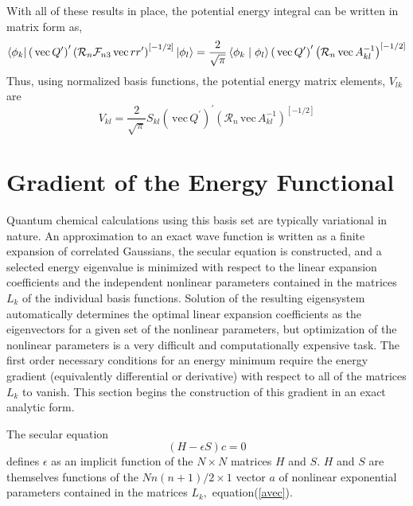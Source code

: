 \documentclass[12pt,thmsa,suthesis,verbatim]{report}
\begin{document}
With all of these results in place, the potential energy integral can be
written in matrix form as, 
\begin{equation}
\left\langle \phi _k\right| \left( \,\mathrm{vec}\,Q^{\prime }\right)
^{\prime }\left( \mathcal{R}_n\mathcal{F}_{n3}\,\mathrm{vec}\,rr^{\prime
}\right) ^{\left[ -1/2\right] }\left| \phi _l\right\rangle =\frac 2{\sqrt{%
\pi }}\left\langle \phi _k\right. |\left. \phi _l\right\rangle \left( \,%
\mathrm{vec}\,Q^{\prime }\right) ^{\prime }\left( \mathcal{R}_n\,\mathrm{vec}%
\,A_{kl}^{-1}\right) ^{\left[ -1/2\right] }
\end{equation}
Thus, using normalized basis functions, the potential energy matrix
elements, $V_{lk}$ are 
\begin{equation}
V_{kl}=\frac 2{\sqrt{\pi }}S_{kl}\left( \,\mathrm{vec}\,Q^{\prime }\right)
^{\prime }\left( \mathcal{R}_n\,\mathrm{vec}\,A_{kl}^{-1}\right) ^{\left[
-1/2\right] }  \label{Vkl}
\end{equation}

\section{Gradient of the Energy Functional}

Quantum chemical calculations using this basis set are typically variational
in nature. An approximation to an exact wave function is written as a finite
expansion of correlated Gaussians, the secular equation is constructed, and
a selected energy eigenvalue is minimized with respect to the linear
expansion coefficients and the independent nonlinear parameters contained in
the matrices $L_k$ of the individual basis functions. Solution of the
resulting eigensystem automatically determines the optimal linear expansion
coefficients as the eigenvectors for a given set of the nonlinear
parameters, but optimization of the nonlinear parameters is a very difficult
and computationally expensive task. The first order necessary conditions for
an energy minimum require the energy gradient (equivalently differential or
derivative) with respect to all of the matrices $L_k$ to vanish. This
section begins the construction of this gradient in an exact analytic form.

The secular equation 
\begin{equation}
\left( H-\epsilon S\right) c=0
\end{equation}
defines $\epsilon $ as an implicit function of the $N\times N$ matrices $H$
and $S$. $H$ and $S$ are themselves functions of the $Nn\left( n+1\right)
/2\times 1$ vector $a$ of nonlinear exponential parameters contained in the
matrices $L_k,$ equation(\ref{avec}).
\end{document}
